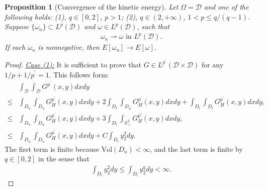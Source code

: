 \documentclass[11pt,letterpaper]{amsart}
\newtheorem{prop}[thm]{Proposition}
\theoremstyle{definition}
\theoremstyle{remark}
\newcommand{\D}{\mathcal{D}}
\newcommand{\R}{\mathbb{R}}
\renewcommand{\O}{\Omega}
\renewcommand{\tt}[1]{\text{#1}}
\numberwithin{equation}{section}
\begin{document}
\begin{prop}[Convergence of the kinetic energy]
\label{prop:weak_finite_volume_energy_convergence}
Let $\O=\D$ and one of the following holds: (1), $q\in[0,2]$, $p>1$; (2), $q\in (2, + \infty)$, $ 1 < p \leq q/(q-1)$.
Suppose \(\{\omega_n\} \subset L^p(\D)\) and \(\omega \in L^p(\D)\), such that 
\begin{align*}
    \omega_n \rightharpoonup \omega  \tt{ in } L^p(\D).
\end{align*}
If each $\omega_n$ is nonnegative, then \(E[\omega_n] \to E[\omega]\).
\end{prop}
\begin{proof}
    \underline{\textit{Case (1):}} It is sufficient to prove that $G\in L^{p^\prime}(\D \times \D)$ for any $1/p+1/p^{\prime}=1$. This follows form:
    \begin{align*}
        & \int_{\D}\int_{\D}G^{p^{\prime}}(x,y)dxdy 
        \\
        \leq & \int_{D_u}\int_{D_u}G_H^{p^{\prime}}(x,y)dxdy + 2\int_{D_l}\int_{D_u}G_H^{p^{\prime}}(x,y)dxdy + \int_{D_l}\int_{D_l}G_H^{p^{\prime}}(x,y)dxdy, \\
        \leq & \int_{D_u}\int_{D_u}G_H^{p^{\prime}}(x,y)dxdy + 3\int_{D_l}\int_{\R^2_+}G_H^{p^{\prime}}(x,y)dxdy, \\
        \leq & \int_{D_u}\int_{D_u}G_H^{p^{\prime}}(x,y)dxdy + C\int_{D_l}y_2^2dy.
    \end{align*}
    The first term is finite because $\tt{Vol}(D_u)<\infty$, and the last term is finite by $q\in[0,2]$ in the sense that 
    \begin{align*}
        \int_{D_l}y_2^2 dy \leq \int_{D_l}y_2^q dy <\infty.
    \end{align*}
    

\end{proof}
\end{document}
